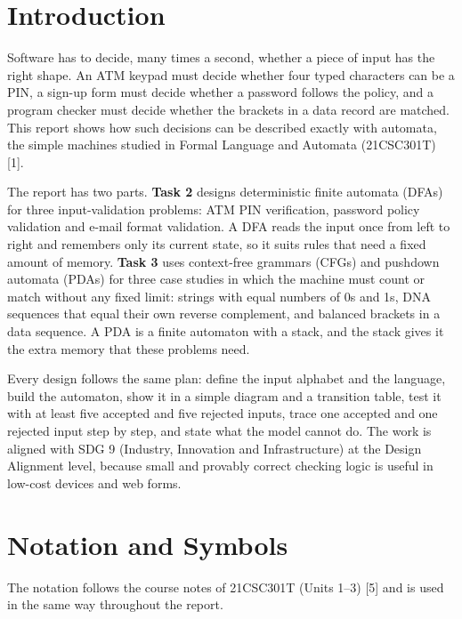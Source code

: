 \documentclass[12pt,a4paper]{article}
\begin{document}
\section{Introduction}

Software has to decide, many times a second, whether a piece of input has the right shape. An ATM keypad must decide whether four typed characters can be a PIN, a sign-up form must decide whether a password follows the policy, and a program checker must decide whether the brackets in a data record are matched. This report shows how such decisions can be described exactly with automata, the simple machines studied in Formal Language and Automata (21CSC301T) [1].

The report has two parts. \textbf{Task 2} designs deterministic finite automata (DFAs) for three input-validation problems: ATM PIN verification, password policy validation and e-mail format validation. A DFA reads the input once from left to right and remembers only its current state, so it suits rules that need a fixed amount of memory. \textbf{Task 3} uses context-free grammars (CFGs) and pushdown automata (PDAs) for three case studies in which the machine must count or match without any fixed limit: strings with equal numbers of 0s and 1s, DNA sequences that equal their own reverse complement, and balanced brackets in a data sequence. A PDA is a finite automaton with a stack, and the stack gives it the extra memory that these problems need.

Every design follows the same plan: define the input alphabet and the language, build the automaton, show it in a simple diagram and a transition table, test it with at least five accepted and five rejected inputs, trace one accepted and one rejected input step by step, and state what the model cannot do. The work is aligned with SDG 9 (Industry, Innovation and Infrastructure) at the Design Alignment level, because small and provably correct checking logic is useful in low-cost devices and web forms.

\section{Notation and Symbols}

The notation follows the course notes of 21CSC301T (Units 1--3) [5] and is used in the same way throughout the report.
\end{document}
